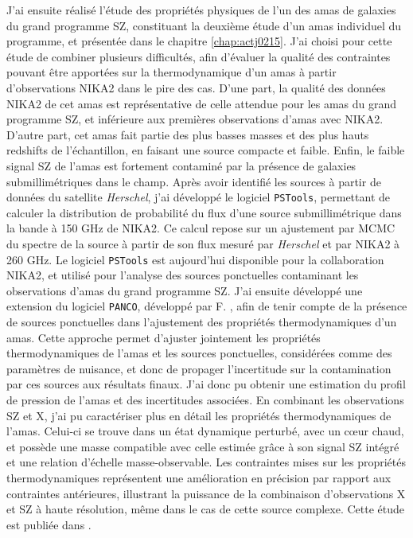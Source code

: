 J'ai ensuite réalisé l'étude des propriétés physiques de l'un des amas de galaxies du grand programme SZ, constituant la deuxième étude d'un amas individuel du programme, et présentée dans le chapitre \ref{chap:actj0215}.
J'ai choisi pour cette étude de combiner plusieurs difficultés, afin d'évaluer la qualité des contraintes pouvant être apportées sur la thermodynamique d'un amas à partir d'observations NIKA2 dans le pire des cas.
D'une part, la qualité des données NIKA2 de cet amas est représentative de celle attendue pour les amas du grand programme SZ, et inférieure aux premières observations d'amas avec NIKA2.
D'autre part, cet amas fait partie des plus basses masses et des plus hauts redshifts de l'échantillon, en faisant une source compacte et faible.
Enfin, le faible signal SZ de l'amas est fortement contaminé par la présence de galaxies submillimétriques dans le champ.
Après avoir identifié les sources à partir de données du satellite \textit{Herschel}, j'ai développé le logiciel \texttt{PSTools}, permettant de calculer la distribution de probabilité du flux d'une source submillimétrique dans la bande à 150 GHz de NIKA2.
Ce calcul repose sur un ajustement par MCMC du spectre de la source à partir de son flux mesuré par \textit{Herschel} et par NIKA2 à 260 GHz.
Le logiciel \texttt{PSTools} est aujourd'hui disponible pour la collaboration NIKA2, et utilisé pour l'analyse des sources ponctuelles contaminant les observations d'amas du grand programme SZ.
J'ai ensuite développé une extension du logiciel \texttt{PANCO}, développé par F. , afin de tenir compte de la présence de sources ponctuelles dans l'ajustement des propriétés thermodynamiques d'un amas.
Cette approche permet d'ajuster jointement les propriétés thermodynamiques de l'amas et les sources ponctuelles, considérées comme des paramètres de nuisance, et donc de propager l'incertitude sur la contamination par ces sources aux résultats finaux.
J'ai donc pu obtenir une estimation du profil de pression de l'amas et des incertitudes associées.
En combinant les observations SZ et X, j'ai pu caractériser plus en détail les propriétés thermodynamiques de l'amas.
Celui-ci se trouve dans un état dynamique perturbé, avec un cœur chaud, et possède une masse compatible avec celle estimée grâce à son signal SZ intégré et une relation d'échelle masse-observable.
Les contraintes mises sur les propriétés thermodynamiques représentent une amélioration en précision par rapport aux contraintes antérieures, illustrant la puissance de la combinaison d'observations X et SZ à haute résolution, même dans le cas de cette source complexe.
Cette étude est publiée dans .

